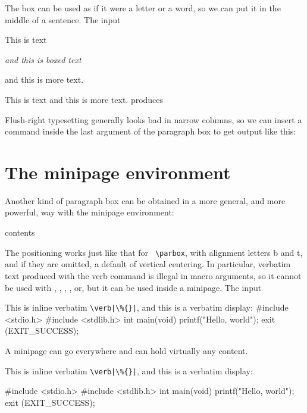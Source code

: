 {The box can be used as if it were a letter or a word, so we can put it in
the middle of a sentence. The input

This is text \parbox{30pt}{\it and this is boxed text} and
this is more text.

This is text 
and this is more text.
produces


Flush-right typesetting generally looks bad in narrow columns, so we
can insert a  command inside the last argument of the paragraph
box to get output like this:


\section*{The minipage environment}
Another kind of paragraph box can be obtained in a more general, and
more powerful, way with the minipage environment:

\begin{teX}
\begin{minipage}[position]{width}
   contents
\end{minipage}
\end{teX}


The positioning works just like that for \verb+ \parbox+, with alignment letters b
and t, and if they are omitted, a default of vertical centering.
In particular, verbatim text produced with the verb command is illegal
in macro arguments, so it cannot be used with , , ,
, or, but it can be used inside a minipage. The input


\begin{teX}
\begin{minipage}{170pt}
This is inline verbatim \verb=\verb|\%{}|=, and this
is a verbatim display:
%
#include <stdio.h>
#include <stdlib.h>
int main(void)
{
printf("Hello, world\n");
exit (EXIT_SUCCESS);
}

\end{minipage}
\end{teX}


A minipage can go everywhere and can hold virtually any content.

\begin{marginfigure}
\begin{minipage}{130pt}
This is inline verbatim \verb=\verb|\%{}|=, and this
is a verbatim display:
\begin{teX}
%
#include <stdio.h>
#include <stdlib.h>
int main(void)
{
printf("Hello, world\n");
exit (EXIT_SUCCESS);
}
\end{teX}
\end{minipage}


\end{marginfigure}}
